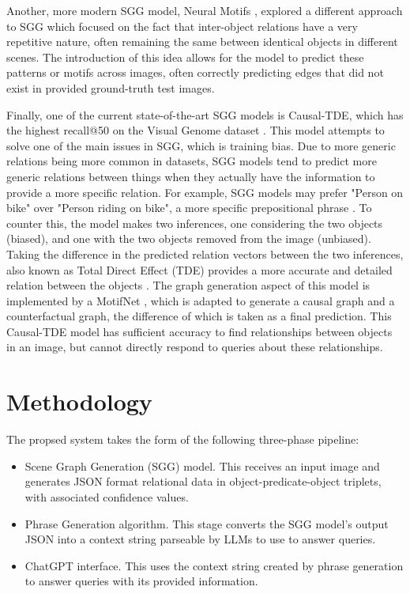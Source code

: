 \documentclass[letterpaper, 10 pt, conference]{ieeeconf}  %
\begin{document}
    Another, more modern SGG model, Neural Motifs \cite{zellers2018scenegraphs}, explored a different approach to SGG which focused on the fact that inter-object relations have a very repetitive nature, often remaining the same between identical objects in different scenes. The introduction of this idea allows for the model to predict these patterns or motifs across images, often correctly predicting edges that did not exist in provided ground-truth test images. 
    
    Finally, one of the current state-of-the-art SGG models is Causal-TDE, which has the highest recall@50 on the Visual Genome dataset \cite{latestinML}. This model attempts to solve one of the main issues in SGG, which is training bias. Due to more generic relations being more common in datasets, SGG models tend to predict more generic relations between things when they actually have the information to provide a more specific relation. For example, SGG models may prefer "Person on bike" over "Person riding on bike", a more specific prepositional phrase \cite{tang2020unbiased}. To counter this, the model makes two inferences, one considering the two objects (biased), and one with the two objects removed from the image (unbiased). Taking the difference in the predicted relation vectors between the two inferences, also known as Total Direct Effect (TDE) provides a more accurate and detailed relation between the objects \cite{tang2020unbiased}. The graph generation aspect of this model is implemented by a MotifNet \cite{zellers2018scenegraphs}, which is adapted to generate a causal graph and a counterfactual graph, the difference of which is taken as a final prediction. This Causal-TDE model has sufficient accuracy to find relationships between objects in an image, but cannot directly respond to queries about these relationships.



\section{Methodology}
    The propsed system takes the form of the following three-phase pipeline:
    \begin{itemize}
        \item Scene Graph Generation (SGG) model. This receives an input image and generates JSON format relational data in object-predicate-object triplets, with associated confidence values.
        \item Phrase Generation algorithm. This stage converts the SGG model's output JSON into a context string parseable by LLMs to use to answer queries.
        \item ChatGPT interface. This uses the context string created by phrase generation to answer queries with its provided information.
    \end{itemize}
\end{document}
